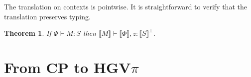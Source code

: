 \documentclass{easychair}
\makeatletter
\newtheorem{theorem}{Theorem}
\newcommand{\ba}{\begin{array}}
\newcommand{\ea}{\end{array}}
\newenvironment{equations}{\[\ba{@{}r@{~}c@{~}l@{}}}{\ea\]}
\newcommand{\key}{\mathsf}
\newcommand{\gvInputType}[2]{?[{#1}].{#2}}
\newcommand{\cpj}[2]{{#1} \vdash {#2}}
\newcommand{\gvj}[3]{{#1} \vdash {#2} : {#3}}
\newcommand{\gvReceiveType}[2]{\key{receiveType}~{#1}~{#2}}
\newcommand{\cpLink}[2]{{#1} \leftrightarrow {#2}}
\newcommand{\cpCut}[3]{\nu {#1}.({#2} \mid {#3})}
\newcommand{\cpReceiveType}[3]{{#1}({#2}).{#3}}
\newcommand{\cpDual}[1]{{#1}^\bot}
\newcommand{\cpExists}[2]{\exists {#1}.{#2}}
\newcommand{\cpForall}[2]{\forall {#1}.{#2}}
\newcommand{\FV}[1]{\mathit{FV}(#1)}
\newcommand{\subst}[3]{{#1}[{#2}/{#3}]}
\newcommand{\hgvpi}{HGV$\pi$\xspace}
\newcommand{\hgvcp}[1]{\llbracket{#1}\rrbracket}
\makeatother
\begin{document}
%
The translation on contexts is pointwise.
It is straightforward to verify that the translation preserves typing.
\begin{theorem}
If $\gvj{\Phi}{M}{S}$ then $\cpj{\hgvcp{M}}{\hgvcp{\Phi},z:\cpDual{\hgvcp{S}}}$.
\end{theorem}


\section{From CP to \hgvpi}
\end{document}
